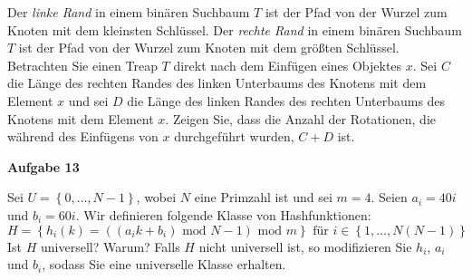 \documentclass{article}
\begin{document}
Der {\it linke Rand} in einem bin{\"a}ren Suchbaum $T$ ist der Pfad von der Wurzel
zum Knoten mit dem kleinsten Schl{\"u}ssel. Der {\it rechte Rand} in einem
bin{\"a}ren Suchbaum $T$ ist der Pfad von der Wurzel zum Knoten mit dem
gr{\"o}{\ss}ten Schl{\"u}ssel. Betrachten Sie einen Treap $T$ direkt nach dem
Einf{\"u}gen eines Objektes $x$. Sei $C$ die L{\"a}nge des rechten Randes des
linken Unterbaums des Knotens mit dem Element $x$ und sei $D$ die L{\"a}nge des
linken Randes des rechten Unterbaums des Knotens mit dem Element $x$. Zeigen Sie,
dass die Anzahl der Rotationen, die w{\"a}hrend des Einf{\"u}gens von $x$
durchgef{\"u}hrt wurden, $C + D$ ist.

\medskip%

{\bfseries Aufgabe 13}%

Sei $U = \left\{ 0, \ldots, N - 1 \right\}$, wobei $N$ eine Primzahl ist und sei
$m = 4$. Seien $a_i = 40i$ und $b_i = 60i$. Wir definieren folgende Klasse von
Hashfunktionen:
\begin{equation}
  H = \left\{ h_i \left( k \right) = \left( \left( a_ik + b_i \right)\text{ mod }N - 1 \right)\text{ mod }m \right\}
  \text{ f{\"u}r } i \in \left\{ 1, \ldots, N \left( N - 1 \right) \right\}
\end{equation}
Ist $H$ universell? Warum? Falls $H$ nicht universell ist, so modifizieren Sie
$h_i$, $a_i$ und $b_i$, sodass Sie eine universelle Klasse erhalten.

\medskip%
\end{document}
